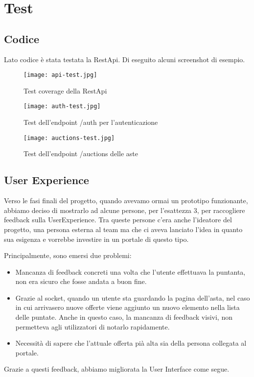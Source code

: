 \section{Test}

\subsection{Codice}
Lato codice è stata testata la RestApi.
Di eseguito alcuni screenshot di esempio.

\begin{figure}[H]
	\centering
	\texttt{[image: api-test.jpg]}
	\caption{Test coverage della RestApi}
	\label{fig:apiTest}
\end{figure}

\begin{figure}[H]
	\centering
	\texttt{[image: auth-test.jpg]}
	\caption{Test dell'endpoint /auth per l'autenticazione}
	\label{fig:authTest}
\end{figure}

\begin{figure}[H]
	\centering
	\texttt{[image: auctions-test.jpg]}
	\caption{Test dell'endpoint /auctions delle aste}
	\label{fig:auctionsTest}
\end{figure}

\clearpage

\subsection{User Experience}
Verso le fasi finali del progetto, quando avevamo ormai un prototipo funzionante, abbiamo deciso di mostrarlo ad alcune persone, per l'esattezza 3, per raccogliere feedback sulla UserExperience.
Tra queste persone c'era anche l'ideatore del progetto, una persona esterna al team ma che ci aveva lanciato l'idea in quanto sua esigenza e vorrebbe investire in un portale di questo tipo.

Principalmente, sono emersi due problemi:

\begin{itemize}
	\item Mancanza di feedback concreti una volta che l'utente effettuava la puntanta, non era sicuro che fosse andata a buon fine.
	\item Grazie al socket, quando un utente sta guardando la pagina dell'asta, 
	nel caso in cui arrivasero nuove offerte viene aggiunto un nuovo elemento nella lista delle puntate.
	Anche in questo caso, la mancanza di feedback visivi, non permetteva agli utilizzatori di notarlo rapidamente.
	\item Necessità di sapere che l'attuale offerta pià alta sia della persona collegata al portale.
\end{itemize}
\bigbreak
\noindent
Grazie a questi feedback, abbiamo migliorata la User Interface come segue.
\clearpage


